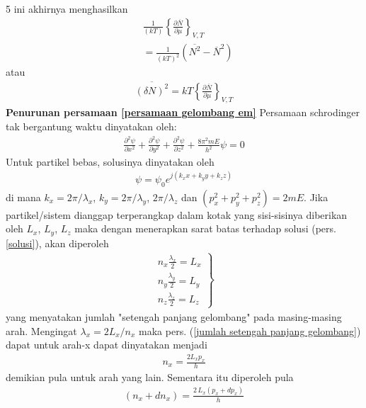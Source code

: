 \documentclass[a4paper  , 6 pt]{article}
\begin{document}
\begin{tiny}
\begin{multicols} {5}
ini akhirnya menghasilkan
\begin{align}
&\frac{1}{(kT)} \left \lbrace \frac{\partial \overline{N}}{\partial \mu }\right \rbrace_{V,T}  \nonumber \\
 &  = \frac{1}{(kT)^2} (\overline{N^2} - \overline{N}^2 )
\end{align}
atau 
\begin{align}
\overline{(\delta N)^2 } = kT \left \lbrace  \frac{\partial \overline{N}}{\partial \mu}\right \rbrace_{V,T} 
\end{align}
 \newline
\textbf{Penurunan  persamaan \ref{persamaan gelombang em}} \newline
Persamaan schrodinger tak bergantung waktu dinyatakan oleh:
\begin{align}
\frac{\partial^2 \psi}{\partial x^2} + \frac{\partial^2 \psi}{\partial y^2} + \frac{\partial^2 \psi}{\partial z^2} + \frac{8 \pi^2 m E}{h^2} \psi  = 0 
\end{align}
Untuk partikel bebas, solusinya dinyatakan oleh
\begin{align}
\psi  = \psi_0 e^{j(k_x x + k_y y + k_z z)} \label{solusi} 
\end{align}
di mana $k_x  = 2 \pi / \lambda_x $, $k_y = 2 \pi / \lambda_y$, $2 \pi / \lambda_z$ dan $(p_x^2 + p_y^2 + p_z^2 ) = 2 m E$. \newline
Jika partikel/sistem dianggap terperangkap dalam kotak yang sisi-sisinya diberikan oleh $L_x$, $L_y$, $L_z$ maka dengan menerapkan sarat batas terhadap solusi (pers. \ref{solusi}), akan diperoleh
\begin{align}
\left. 
\begin{array}{l}
n_x \frac{\lambda_x}{2} = L_x \\
n_y \frac{\lambda_y}{2} = L_y \\
n_z \frac{\lambda_z}{2} = L_z   
\end{array} \right \rbrace \label{jumlah setengah panjang gelombang}
\end{align}
yang menyatakan jumlah "setengah panjang gelombang" pada masing-masing arah. Mengingat $\lambda_x = 2 L_x / n_x $ maka  pers. (\ref{jumlah setengah panjang gelombang}) dapat untuk arah-x dapat dinyatakan menjadi 
\begin{align}
n_x = \frac{2 L_x p_x }{h} 
\end{align}
demikian pula untuk arah yang lain. Sementara itu diperoleh pula 
\begin{align}
(n_x + d n_x ) = \frac{2\, L_x (p_x + d p_x)}{h}
\end{align}

\end{multicols}
\end{tiny}
\end{document}

